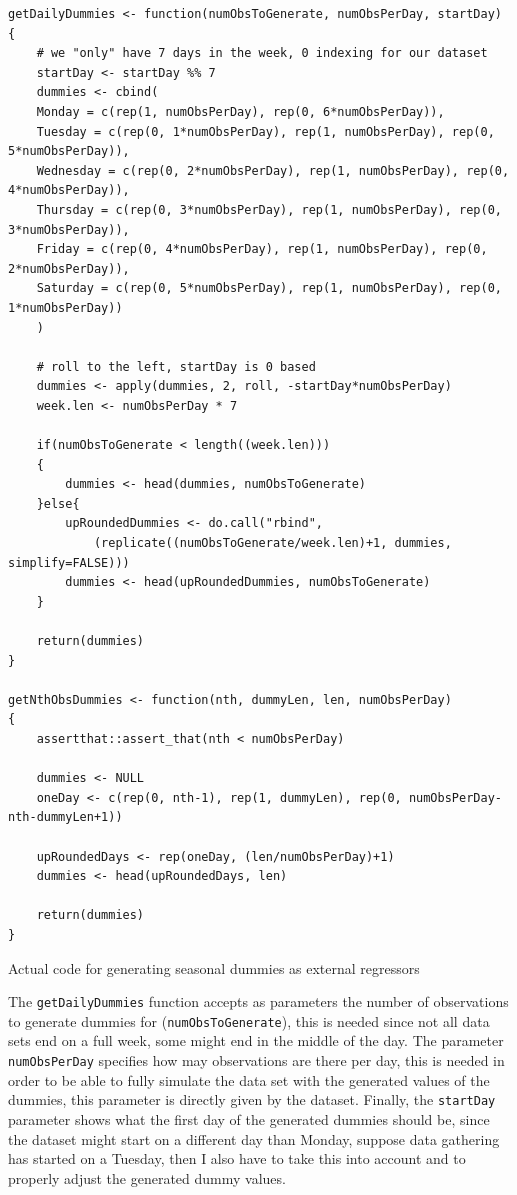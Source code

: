\documentclass[12pt,a4paper,titlepage]{report}
\begin{document}
\begin{listing}[h]
\begin{verbatim}
getDailyDummies <- function(numObsToGenerate, numObsPerDay, startDay)
{
    # we "only" have 7 days in the week, 0 indexing for our dataset
    startDay <- startDay %% 7  
    dummies <- cbind(
    Monday = c(rep(1, numObsPerDay), rep(0, 6*numObsPerDay)),
    Tuesday = c(rep(0, 1*numObsPerDay), rep(1, numObsPerDay), rep(0, 5*numObsPerDay)),
    Wednesday = c(rep(0, 2*numObsPerDay), rep(1, numObsPerDay), rep(0, 4*numObsPerDay)),
    Thursday = c(rep(0, 3*numObsPerDay), rep(1, numObsPerDay), rep(0, 3*numObsPerDay)),
    Friday = c(rep(0, 4*numObsPerDay), rep(1, numObsPerDay), rep(0, 2*numObsPerDay)),
    Saturday = c(rep(0, 5*numObsPerDay), rep(1, numObsPerDay), rep(0, 1*numObsPerDay))
    )
    
    # roll to the left, startDay is 0 based
    dummies <- apply(dummies, 2, roll, -startDay*numObsPerDay) 
    week.len <- numObsPerDay * 7
    
    if(numObsToGenerate < length((week.len)))
    {
        dummies <- head(dummies, numObsToGenerate)
    }else{
        upRoundedDummies <- do.call("rbind", 
            (replicate((numObsToGenerate/week.len)+1, dummies, simplify=FALSE)))
        dummies <- head(upRoundedDummies, numObsToGenerate)
    }
    
    return(dummies)
}

getNthObsDummies <- function(nth, dummyLen, len, numObsPerDay)
{
    assertthat::assert_that(nth < numObsPerDay)
    
    dummies <- NULL
    oneDay <- c(rep(0, nth-1), rep(1, dummyLen), rep(0, numObsPerDay-nth-dummyLen+1))
    
    upRoundedDays <- rep(oneDay, (len/numObsPerDay)+1)
    dummies <- head(upRoundedDays, len)
    
    return(dummies)
}
\end{verbatim}

\caption{Actual code for generating seasonal dummies as external regressors}
\label{dummiescode}
\end{listing}

The \texttt{getDailyDummies} function accepts as parameters the number of observations to generate dummies for (\texttt{numObsToGenerate}), this is needed since not all data sets end on a full week, some might end in the middle of the day. The parameter \texttt{numObsPerDay} specifies how may observations are there per day, this is needed in order to be able to fully simulate the data set with the generated values of the dummies, this parameter is directly given by the dataset. Finally, the \texttt{startDay} parameter shows what the first day of the generated dummies should be, since the dataset might start on a different day than Monday, suppose data gathering has started on a Tuesday, then I also have to take this into account and to properly adjust the generated dummy values.
\end{document}
